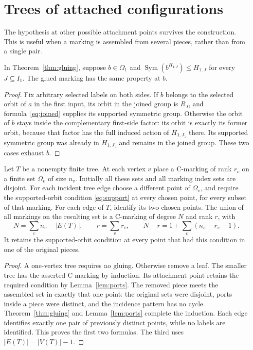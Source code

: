\documentclass[a4paper,11pt]{article}
\newcommand{\Sym}{\operatorname{Sym}}
\begin{document}
\section{Trees of attached configurations}
The hypothesis at other possible attachment points survives the construction.
This is useful when a marking is assembled from several pieces, rather than
from a single pair.

\begin{lemma}\label{lem:ports}
In Theorem~\ref{thm:gluing}, suppose $b\in\Omega_1$ and
$\Sym(b^{H_{1,J}})\leq H_{1,J}$ for every $J\subseteq I_1$.
The glued marking has the same property at $b$.
\end{lemma}
\begin{proof}
Fix arbitrary selected labels on both sides. If $b$ belongs to the selected
orbit of $a$ in the first input, its orbit in the joined group is $R_J$,
and formula~\eqref{eq:joined} supplies its supported symmetric group.
Otherwise the orbit of $b$ stays inside the complementary first-side factor:
its orbit is exactly its former orbit, because that factor has the full induced
action of $H_{1,J_1}$ there. Its supported symmetric group was already in
$H_{1,J_1}$ and remains in the joined group. These two cases exhaust $b$.
\end{proof}

\begin{corollary}\label{cor:tree}
Let $T$ be a nonempty finite tree. At each vertex $v$ place a C-marking of rank $r_v$
on a finite set $\Omega_v$ of size $n_v$. Initially all these sets and all
marking index sets are disjoint. For each incident tree edge choose a different
point of $\Omega_v$, and require the supported-orbit condition
\eqref{eq:support} at every chosen point, for every subset of that marking.
For each edge of $T$, identify its two chosen points. The union of all markings
on the resulting set is a C-marking of degree $N$ and rank $r$, with
\[
 N=\sum_v n_v-|E(T)|,\qquad r=\sum_v r_v,\qquad
 N-r=1+\sum_v(n_v-r_v-1).
\]
It retains the supported-orbit condition at every point that had this
condition in one of the original pieces.
\end{corollary}
\begin{proof}
A one-vertex tree requires no gluing. Otherwise remove a leaf. The smaller
tree has the asserted C-marking by induction. Its attachment point retains
the required condition by Lemma~\ref{lem:ports}. The removed piece meets the
assembled set in exactly that one point: the original sets were disjoint,
ports inside a piece were distinct, and the incidence pattern has no cycle.
Theorem~\ref{thm:gluing} and Lemma~\ref{lem:ports} complete the induction.
Each edge identifies exactly one pair of previously distinct points, while
no labels are identified. This proves the first two formulas. The third uses
$|E(T)|=|V(T)|-1$.
\end{proof}
\end{document}
